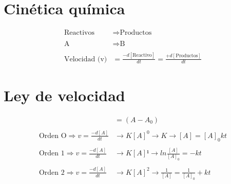 \section{Cinética química}


\begin{align}
    \text{Reactivos} &\Longrightarrow \text{Productos} 
    \\
    \\
    \text{A} &\Longrightarrow \text{B}
    \\
    \\
    \text{Velocidad (v)} &= \frac{-d[\text{Reactivo}]}{dt}=\frac{+d[\text{Productos}]}{dt}
\end{align}


\section{Ley de velocidad}


\begin{align}
    [A] &= (A-A_0)
    \\
    \\
    \text{Orden O} \Longrightarrow v = \frac{-d[A]}{dt} &\rightarrow K[A]^0 \rightarrow K \rightarrow [A] = [A]_0kt
    \\
    \\
    \text{Orden 1} \Longrightarrow v = \frac{-d[A]}{dt} &\rightarrow K[A]¹
    \rightarrow ln \frac{[A]}{[A]_0} = -kt
    \\
    \\
    \text{Orden 2} \Longrightarrow v = \frac{-d[A]}{dt} &\rightarrow K[A]^2 \rightarrow \frac{1}{[A]} = \frac{1}{[A]_0} + kt
\end{align}

